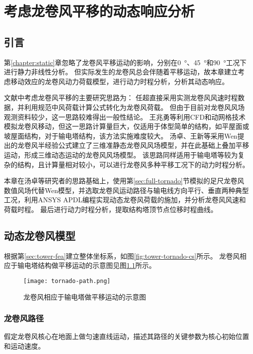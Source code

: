 \graphicspath{{figures/dynamic/}}

\chapter{考虑龙卷风平移的动态响应分析}

\section{引言}
第\ref{chapter:static}章忽略了龙卷风平移运动的影响，分别在\SI{0}{\degree}、\SI{45}{\degree}和\SI{90}{\degree}工况下进行静力非线性分析。
但实际发生的龙卷风总会伴随着平移运动，故本章建立考虑移动效应的龙卷风动力荷载模型，进行动力时程分析，分析其动态响应。

文献中考虑龙卷风平移的主要研究思路为：
任超\cite{ren2010tower}直接采用实测龙卷风风速时程数据，并利用规范中风荷载计算公式转化为龙卷风荷载。
但由于目前对龙卷风风场观测资料较少，这一思路较难得出一般性结论。
王兆勇等\cite{wang2015different}利用CFD和动网格技术模拟龙卷风移动，但这一思路计算量巨大，仅适用于体型简单的结构，如平屋面或坡屋面结构，对于输电塔结构，该方法实施难度较大。
汤卓\cite{tang2012tornado}、王新等\cite{wang2016tornado}采用Wen\cite{wen1975dynamic}提出的龙卷风半经验公式建立了三维准静态龙卷风风场模型，并在此基础上叠加平移运动，形成三维动态运动的龙卷风风场模型。
该思路同样适用于输电塔等较为复杂的结构，且计算量相对较小，可以进行龙卷风多种平移工况下的动力时程分析。

本章在汤卓等研究者的思路基础上，使用第\ref{sec:full-tornado}节模拟的足尺龙卷风数值风场代替Wen模型，并选取龙卷风运动路径与输电线方向平行、垂直两种典型工况，利用ANSYS APDL编程实现动态龙卷风荷载的施加，并分析龙卷风风速和荷载时程。
最后进行动力时程分析，提取结构塔顶节点位移时程曲线。

\section{动态龙卷风模型}
根据第\ref{sec:tower-fea}建立整体坐标系，如图\ref{fig:tower-tornado-cs}所示。
龙卷风相应于输电塔结构做平移运动的示意图见图\ref{fig:tornado-path}所示。
\begin{figure}[!htpb]
	\centering
	\texttt{[image: tornado-path.png]}
	\caption{龙卷风相应于输电塔做平移运动的示意图}
	\label{fig:tornado-path}
\end{figure}

\subsection{龙卷风路径}
假定龙卷风核心在地面上做匀速直线运动，描述其路径的关键参数为核心初始位置和运动速度。

